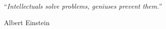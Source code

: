 
\vspace*{0.2\textheight}

\noindent\enquote{\itshape Intellectuals solve problems, geniuses prevent them.}\bigbreak

\hfill Albert Einstein